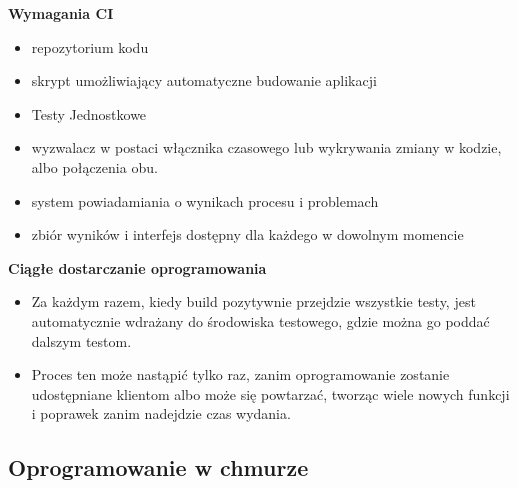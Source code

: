 \documentclass[a4paper]{article}
\begin{document}
        \textbf{Wymagania CI}
        \begin{itemize}
            \item repozytorium kodu
            \item skrypt umożliwiający automatyczne budowanie aplikacji
            \item Testy Jednostkowe
            \item wyzwalacz w postaci włącznika czasowego lub wykrywania zmiany w kodzie, albo połączenia obu.
            \item system powiadamiania o wynikach procesu i problemach
            \item zbiór wyników i interfejs dostępny dla każdego w dowolnym momencie
        \end{itemize}

        \textbf{Ciągłe dostarczanie oprogramowania}
        \begin{itemize}
            \item Za każdym razem, kiedy build pozytywnie przejdzie wszystkie testy, jest automatycznie wdrażany do
            środowiska testowego, gdzie można go poddać dalszym testom.
            \item Proces ten może nastąpić tylko raz, zanim oprogramowanie zostanie udostępniane klientom
            albo może się powtarzać, tworząc wiele nowych funkcji i poprawek zanim nadejdzie czas wydania.
        \end{itemize}


        \subsection{Oprogramowanie w chmurze}
\end{document}
